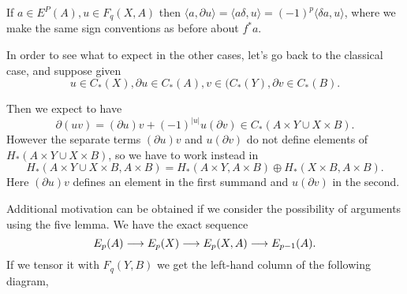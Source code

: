 \documentclass[../main]{subfiles}
\begin{document}
\par If $a \in E^P(A), u \in F_q(X,A)$ then $\langle a, \partial u \rangle = \langle a\delta,u\rangle=(-1)^p\langle\delta a,u\rangle$, where we make the same sign conventions as before about $f^\ast a$.

\par In order to see what to expect in the other cases, let's go back to the classical case, and suppose given $$u \in C_\ast(X), \partial u \in C_\ast(A), v\in (C_\ast(Y), \partial v \in C_\ast(B).$$

Then we expect to have $$\partial (uv) = (\partial u)v + (-1)^{|u|}u(\partial v) \in C_\ast (A \times Y \cup X \times B).$$ However the separate terms $(\partial u)v$ and $u(\partial v)$ do not define elements of $H_\ast(A \times Y \cup X \times B)$, so we have to work instead in $$H_\ast(A \times Y \cup X \times B, A \times B) = H_\ast(A \times Y, A \times B) \oplus H_\ast(X\times B, A\times B).$$ Here $(\partial u)v$ defines an element in the first summand and $u(\partial v)$ in the second.

\par Additional motivation can be obtained if we consider the possibility of arguments using the five lemma. We have the exact sequence $$E_p(A) \overset{}{\longrightarrow} E_p(X) \overset{}{\longrightarrow} E_p(X,A) \overset{}{\longrightarrow} E_{p-1}(A).$$  If we tensor it with $F_q(Y,B)$ we get the left-hand column of the following diagram,
\end{document}
